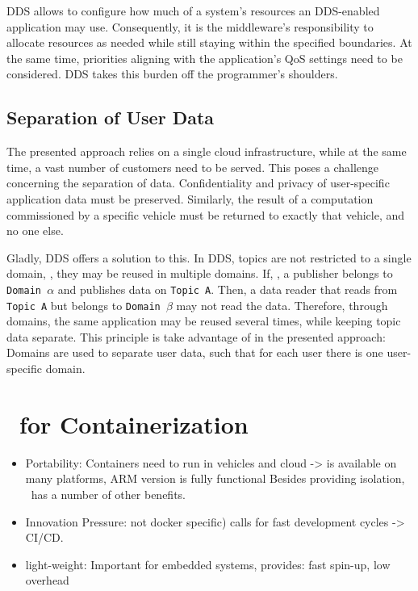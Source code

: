 DDS allows to configure how much of a system's resources an DDS-enabled application may use. Consequently, it is the middleware's responsibility to allocate resources as needed while still staying within the specified boundaries. At the same time, priorities aligning with the application's QoS settings need to be considered. DDS takes this burden off the programmer's shoulders.



\subsection{Separation of User Data}
The presented approach relies on a single cloud infrastructure, while at the same time, a vast number of customers need to be served. This poses a challenge concerning the separation of data. Confidentiality and privacy of user-specific application data must be preserved. Similarly, the result of a computation commissioned by a specific vehicle must be returned to exactly that vehicle, and no one else. 

Gladly, DDS offers a solution to this. In DDS, topics are not restricted to a single domain, \ie , they may be reused in multiple domains. If, \eg , a publisher belongs to \texttt{Domain $\alpha$} and publishes data on \texttt{Topic A}. Then, a data reader that reads from \texttt{Topic A} but belongs to \texttt{Domain $\beta$} may not read the data. Therefore, through domains, the same application may be reused several times, while keeping topic data separate. This principle is take advantage of in the presented approach: Domains are used to separate user data, such that for each user there is one user-specific domain.

%
%
%
%
%
%
%
%
%
%

\section{\docker\ for Containerization}

\begin{itemize}
	\item Portability: Containers need to run in vehicles and cloud -> \docker is available on many platforms, ARM version is fully functional
Besides providing isolation, \docker\ has a number of other benefits.
	\item Innovation Pressure: not docker specific) calls for fast development cycles -> CI/CD.
	\item light-weight: Important for embedded systems, provides: fast spin-up, low overhead
\end{itemize}


